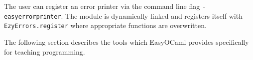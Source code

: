 The user can register an error printer via the command line flag 
\texttt{-easyerrorprinter}.  The module is dynamically linked and 
registers itself with \texttt{EzyErrors.register} where appropriate 
functions are overwritten.

The following section describes the tools which EasyOCaml provides 
specifically for teaching programming.
